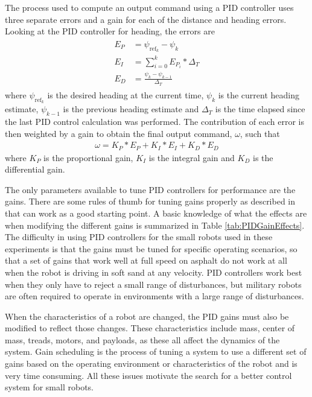 The process used to compute an output command using a PID controller uses three separate errors and a gain for each of the distance and heading errors. Looking at the PID controller for heading, the errors are
\begin{align*}
\begin{split}
E_P &= \psi_{\text{ref}_k} - \psi_k \\
E_I &= \sum_{i=0}^{k}E_{P_i}*\Delta_T \\
E_D &= \frac{\psi_k - \psi_{k-1}}{\Delta_T}
\end{split}
\end{align*}
where $\psi_{\text{ref}_k}$ is the desired heading at the current time, $\psi_k$ is the current heading estimate, $\psi_{k-1}$ is the previous heading estimate and $\Delta_T$ is the time elapsed since the last PID control calculation was performed. The contribution of each error is then weighted by a gain to obtain the final output command, $\omega$, such that
\begin{align*}
\omega = K_P*E_P + K_I*E_I + K_D*E_D
\end{align*}
where $K_P$ is the proportional gain, $K_I$ is the integral gain and $K_D$ is the differential gain.

The only parameters available to tune PID controllers for performance are the gains. There are some rules of thumb for tuning gains properly as described in \cite{ZeiglerNichols42} that can work as a good starting point. A basic knowledge of what the effects are when modifying the different gains is summarized in Table \ref{tab:PIDGainEffects}. The difficulty in using PID controllers for the small robots used in these experiments is that the gains must be tuned for specific operating scenarios, so that a set of gains that work well at full speed on asphalt do not work at all when the robot is driving in soft sand at any velocity. PID controllers work best when they only have to reject a small range of disturbances, but military robots are often required to operate in environments with a large range of disturbances.

When the characteristics of a robot are changed, the PID gains must also be modified to reflect those changes. These characteristics include mass, center of mass, treads, motors, and payloads, as these all affect the dynamics of the system. Gain scheduling is the process of tuning a system to use a different set of gains based on the operating environment or characteristics of the robot and is very time consuming. All these issues motivate the search for a better control system for small robots.

